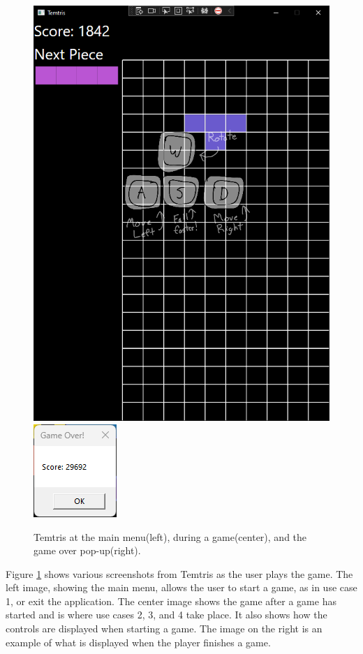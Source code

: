 \documentclass[10pt,conference,onecolumn,compsoc]{IEEEtran}
\begin{document}
\begin{figure}[!h]
\includegraphics[scale=0.3]{Temtris_Game.png}
\includegraphics[scale=.8]{Temtris_GameOver.png}
\caption{Temtris at the main menu(left), during a game(center), and the game over pop-up(right).}
\label{fig:uimockups}
\end{figure}

Figure \ref{fig:uimockups} shows various screenshots from Temtris as the user plays the game. The left image, showing the main menu, allows the user to start a game, as in use case 1, or exit the application. The center image shows the game after a game has started and is where use cases 2, 3, and 4 take place. It also shows how the controls are displayed when starting a game. The image on the right is an example of what is displayed when the player finishes a game.
\end{document}
